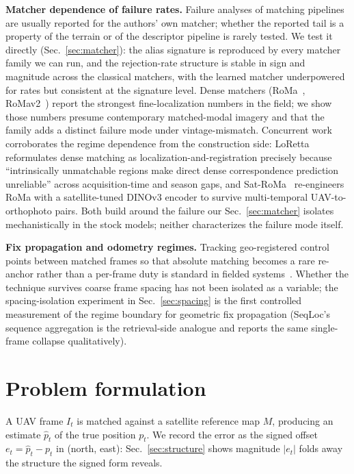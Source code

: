 \documentclass[journal]{IEEEtran}
\begin{document}
\textbf{Matcher dependence of failure rates.} Failure analyses of matching pipelines are usually reported for the authors' own matcher; whether the reported tail is a property of the terrain or of the descriptor pipeline is rarely tested. We test it directly (Sec.~\ref{sec:matcher}): the alias signature is reproduced by every matcher family we can run, and the rejection-rate structure is stable in sign and magnitude across the classical matchers, with the learned matcher underpowered for rates but consistent at the signature level. Dense matchers (RoMa~\cite{roma}, RoMav2~\cite{xianvisloc}) report the strongest fine-localization numbers in the field; we show those numbers presume contemporary matched-modal imagery and that the family adds a distinct failure mode under vintage-mismatch. Concurrent work corroborates the regime dependence from the construction side: LoRetta~\cite{loretta} reformulates dense matching as localization-and-registration precisely because ``intrinsically unmatchable regions make direct dense correspondence prediction unreliable'' across acquisition-time and season gaps, and Sat-RoMa~\cite{satroma} re-engineers RoMa with a satellite-tuned DINOv3 encoder to survive multi-temporal UAV-to-orthophoto pairs. Both build around the failure our Sec.~\ref{sec:matcher} isolates mechanistically in the stock models; neither characterizes the failure mode itself.

\textbf{Fix propagation and odometry regimes.} Tracking geo-registered control points between matched frames so that absolute matching becomes a rare re-anchor rather than a per-frame duty is standard in fielded systems~\cite{yao2024,orthotrack}. Whether the technique survives coarse frame spacing has not been isolated as a variable; the spacing-isolation experiment in Sec.~\ref{sec:spacing} is the first controlled measurement of the regime boundary for geometric fix propagation (SeqLoc's sequence aggregation is the retrieval-side analogue and reports the same single-frame collapse qualitatively).

\section{Problem formulation}
\label{sec:model}

A UAV frame $I_t$ is matched against a satellite reference map $M$, producing an estimate $\hat{p}_t$ of the true position $p_t$. We record the error as the signed offset $e_t = \hat{p}_t - p_t$ in (north, east): Sec.~\ref{sec:structure} shows magnitude $|e_t|$ folds away the structure the signed form reveals.
\end{document}
